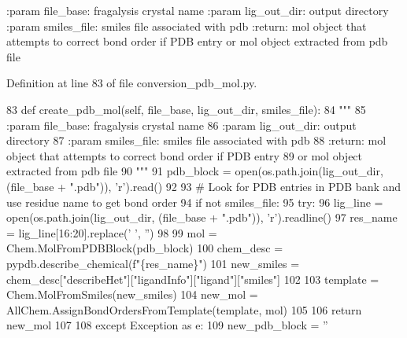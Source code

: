 \begin{DoxyVerb}:param file_base: fragalysis crystal name
:param lig_out_dir: output directory
:param smiles_file: smiles file associated with pdb
:return: mol object that attempts to correct bond order if PDB entry
or mol object extracted from pdb file
\end{DoxyVerb}
 

Definition at line 83 of file conversion\+\_\+pdb\+\_\+mol.\+py.


\begin{DoxyCode}
83     \textcolor{keyword}{def }create\_pdb\_mol(self, file\_base, lig\_out\_dir, smiles\_file):
84         \textcolor{stringliteral}{"""}
85 \textcolor{stringliteral}{        :param file\_base: fragalysis crystal name}
86 \textcolor{stringliteral}{        :param lig\_out\_dir: output directory}
87 \textcolor{stringliteral}{        :param smiles\_file: smiles file associated with pdb}
88 \textcolor{stringliteral}{        :return: mol object that attempts to correct bond order if PDB entry}
89 \textcolor{stringliteral}{                or mol object extracted from pdb file}
90 \textcolor{stringliteral}{        """}
91         pdb\_block = open(os.path.join(lig\_out\_dir, (file\_base + \textcolor{stringliteral}{".pdb"})), \textcolor{stringliteral}{'r').read()}
92 \textcolor{stringliteral}{}
93 \textcolor{stringliteral}{        }\textcolor{comment}{# Look for PDB entries in PDB bank and use residue name to get bond order}
94         \textcolor{keywordflow}{if} \textcolor{keywordflow}{not} smiles\_file:
95             \textcolor{keywordflow}{try}:
96                 lig\_line = open(os.path.join(lig\_out\_dir, (file\_base + \textcolor{stringliteral}{".pdb"})), \textcolor{stringliteral}{'r').readline()}
97 \textcolor{stringliteral}{                res\_name = lig\_line[16:20].replace(' '}, \textcolor{stringliteral}{''})
98 
99                 mol = Chem.MolFromPDBBlock(pdb\_block)
100                 chem\_desc = pypdb.describe\_chemical(f\textcolor{stringliteral}{"\{res\_name\}"})
101                 new\_smiles = chem\_desc[\textcolor{stringliteral}{"describeHet"}][\textcolor{stringliteral}{"ligandInfo"}][\textcolor{stringliteral}{"ligand"}][\textcolor{stringliteral}{"smiles"}]
102 
103                 template = Chem.MolFromSmiles(new\_smiles)
104                 new\_mol = AllChem.AssignBondOrdersFromTemplate(template, mol)
105 
106                 \textcolor{keywordflow}{return} new\_mol
107 
108             \textcolor{keywordflow}{except} Exception \textcolor{keyword}{as} e:
109                 new\_pdb\_block = \textcolor{stringliteral}{''}

\end{DoxyCode}
